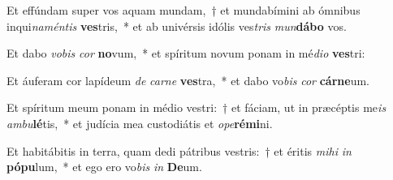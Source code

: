 \item Et effúndam super vos aquam mundam,~† et mundabímini ab ómnibus inqui\textit{na}\textit{mén}\textit{tis} \textbf{ves}tris,~* et ab univérsis idólis ves\textit{tris} \textit{mun}\textbf{dá}\textbf{bo} vos.
\item Et dabo \textit{vo}\textit{bis} \textit{cor} \textbf{no}vum,~* et spíritum novum ponam in mé\textit{di}\textit{o} \textbf{ves}tri:
\item Et áuferam cor lapídeum \textit{de} \textit{car}\textit{ne} \textbf{ves}tra,~* et dabo vo\textit{bis} \textit{cor} \textbf{cár}\textbf{ne}um.
\item Et spíritum meum ponam in médio vestri:~† et fáciam, ut in præcéptis me\textit{is} \textit{am}\textit{bu}\textbf{lé}tis,~* et judícia mea custodiátis et \textit{o}\textit{pe}\textbf{ré}\textbf{mi}ni.
\item Et habitábitis in terra, quam dedi pátribus vestris:~† et éritis \textit{mi}\textit{hi} \textit{in} \textbf{pó}\textbf{pu}lum,~* et ego ero vo\textit{bis} \textit{in} \textbf{De}um.
